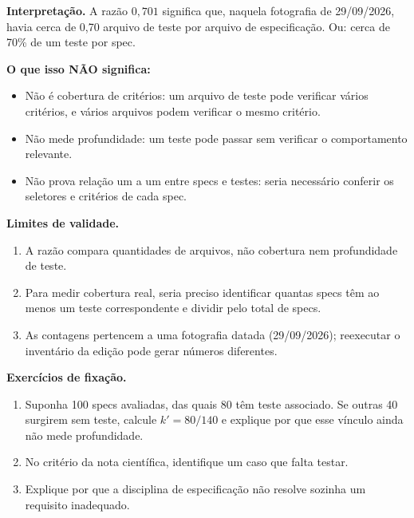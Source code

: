 \begin{descricao}
\textbf{Interpretação.} A razão $0{,}701$ significa que, naquela fotografia de 29/09/2026, havia cerca de 0,70 arquivo de teste por arquivo de especificação. Ou: cerca de 70\% de um teste por spec.

\textbf{O que isso NÃO significa:}
\begin{itemize}[leftmargin=1.3em,itemsep=1pt]
  \item Não é cobertura de critérios: um arquivo de teste pode verificar vários critérios, e vários arquivos podem verificar o mesmo critério.
  \item Não mede profundidade: um teste pode passar sem verificar o comportamento relevante.
  \item Não prova relação um a um entre specs e testes: seria necessário conferir os seletores e critérios de cada spec.
\end{itemize}
\end{descricao}

\begin{aviso}
\textbf{Limites de validade.}
\begin{enumerate}[leftmargin=1.3em,itemsep=1pt]
  \item A razão compara quantidades de arquivos, não cobertura nem profundidade de teste.
  \item Para medir cobertura real, seria preciso identificar quantas specs têm ao menos um teste correspondente e dividir pelo total de specs.
  \item As contagens pertencem a uma fotografia datada (29/09/2026); reexecutar o inventário da edição pode gerar números diferentes.
\end{enumerate}
\end{aviso}

\begin{resultado}
\textbf{Exercícios de fixação.}
\begin{enumerate}[leftmargin=1.3em,itemsep=2pt]
  \item Suponha 100 specs avaliadas, das quais 80 têm teste associado. Se outras 40 surgirem sem teste, calcule $k'=80/140$ e explique por que esse vínculo ainda não mede profundidade.
  \item No critério da nota científica, identifique um caso que falta testar.
  \item Explique por que a disciplina de especificação não resolve sozinha um requisito inadequado.
\end{enumerate}
\end{resultado}


